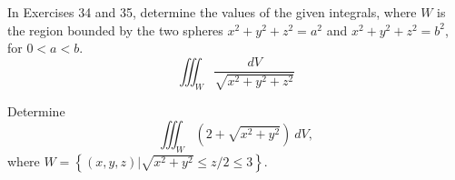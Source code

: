 \documentclass[12pt,letterpaper]{hmcpset}
\newcommand{\pn}[1]{\left(#1\right)}
\newcommand{\cbk}[1]{\left\{#1\right\}}
\newcommand{\s}[1]{\sqrt{#1}}
\newcommand{\f}[2]{\frac{#1}{#2}}
\begin{document}
\begin{problem}[Colley 5.5.34]
    In Exercises 34 and 35, determine the values of the given
    integrals, where $W$ is the region bounded by the two spheres
    $x^2+y^2+z^2=a^2$ and $x^2+y^2+z^2=b^2$, for $0<a<b$.
    \[
        \iiint_W\f{dV}{\s{x^2+y^2+z^2}}
    \]
\end{problem}
\begin{solution}
    \vfill
\end{solution}
\newpage

\begin{problem}[Colley 5.5.38]
    Determine
    \[
        \iiint_W\pn{2+\s{x^2+y^2}}~dV,
    \]
    where $W=\cbk{(x,y,z)|\s{x^2+y^2}\leq z/2\leq3}$.
\end{problem}
\begin{solution}
    \vfill
\end{solution}
\end{document}
